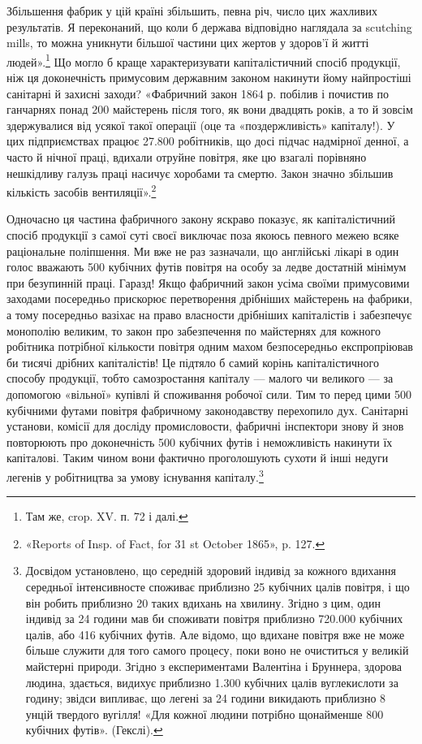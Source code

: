 Збільшення фабрик у цій країні збільшить, певна річ, число цих
жахливих результатів. Я переконаний, що коли б держава відповідно наглядала за scutching mills, то
можна уникнути більшої частини цих жертов у здоров’ї й житті людей».\footnote{
Там же, crop. XV. п. 72 і далі.
} Що могло б
краще характеризувати капіталістичний спосіб продукції, ніж
ця доконечність примусовим державним законом накинути йому
найпростіші санітарні й захисні заходи? «Фабричний закон 1864 р.
побілив і почистив по ганчарнях понад 200 майстерень після
того, як вони двадцять років, а то й зовсім здержувалися від
усякої такої операції (оце та «поздержливість» капіталу!). У цих
підприємствах працює 27.800 робітників, що досі підчас надмірної денної, а часто й нічної праці,
вдихали отруйне повітря,
яке цю взагалі порівняно нешкідливу галузь праці насичує
хоробами та смертю. Закон значно збільшив кількість засобів
вентиляції».\footnote{
«Reports of Insp. of Fact, for 31 st October 1865», p. 127.
}

Одночасно ця частина фабричного закону яскраво показує, як
капіталістичний спосіб продукції з самої суті своєї виключає
поза якоюсь певного межею всяке раціональне поліпшення. Ми
вже не раз зазначали, що англійські лікарі в один голос вважають
500 кубічних футів повітря на особу за ледве достатній мінімум
при безупинній праці. Гаразд! Якщо фабричний закон усіма
своїми примусовими заходами посередньо прискорює перетворення дрібніших майстерень на фабрики, а
тому посередньо
вазіхає на право власности дрібніших капіталістів і забезпечує
монополію великим, то закон про забезпечення по майстернях
для кожного робітника потрібної кількости повітря одним махом
безпосередньо експропріював би тисячі дрібних капіталістів!
Це підтяло б самий корінь капіталістичного способу продукції,
тобто самозростання капіталу — малого чи великого — за допомогою «вільної» купівлі й споживання
робочої сили. Тим то
перед цими 500 кубічними футами повітря фабричному законодавству перехопило дух. Санітарні установи,
комісії для досліду промисловости, фабричні інспектори знову й знов повторюють про доконечність 500
кубічних футів і неможливість накинути їх капіталові. Таким чином вони фактично проголошують
сухоти й інші недуги легенів у робітництва за умову існування
капіталу.\footnote{
Досвідом установлено, що середній здоровий індивід за кожного
вдихання середньої інтенсивносте споживає приблизно 25 кубічних
цалів  повітря, і що він робить приблизно 20 таких вдихань на хвилину. Згідно з цим, один індивід за
24 години мав би споживати повітря приблизно 720.000 кубічних цалів, або 416 кубічних футів. Але
відомо, що вдихане повітря вже не може більше служити для того самого
процесу, поки воно не очиститься у великій майстерні природи. Згідно
з експериментами Валентіна і Бруннера, здорова людина, здається, видихує приблизно 1.300 кубічних
цалів вуглекислоти за годину; звідси
випливає, що легені за 24 години викидають приблизно 8 унцій твердого
вугілля! «Для кожної людини потрібно щонайменше 800 кубічних
футів». (Гекслі).
}